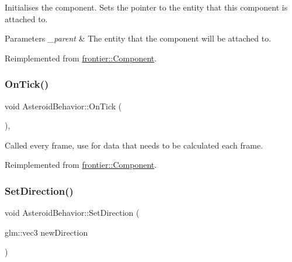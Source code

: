 Initialises the component. Sets the pointer to the entity that this component is attached to. 


\begin{DoxyParams}{Parameters}
{\em \+\_\+parent} & The entity that the component will be attached to. \\
\hline
\end{DoxyParams}


Reimplemented from \hyperlink{classfrontier_1_1_component_af3da02905c4d79219d9b12f260a35ad1}{frontier\+::\+Component}.

\mbox{\label{class_asteroid_behavior_a3c1287599e132b49be851d9eeec6380e}} 
\subsubsection{\texorpdfstring{On\+Tick()}{OnTick()}}
{\footnotesize\ttfamily void Asteroid\+Behavior\+::\+On\+Tick (\begin{DoxyParamCaption}{ }\end{DoxyParamCaption})\hspace{0.3cm}{\ttfamily [override]}, {\ttfamily [virtual]}}



Called every frame, use for data that needs to be calculated each frame. 



Reimplemented from \hyperlink{classfrontier_1_1_component_ab920f9bc07ce051ebb5559c5a66508d1}{frontier\+::\+Component}.

\mbox{\label{class_asteroid_behavior_ab1f0bf83f6291bda3934c1b48141908f}} 
\subsubsection{\texorpdfstring{Set\+Direction()}{SetDirection()}}
{\footnotesize\ttfamily void Asteroid\+Behavior\+::\+Set\+Direction (\begin{DoxyParamCaption}\item[{glm\+::vec3}]{new\+Direction }\end{DoxyParamCaption})}

